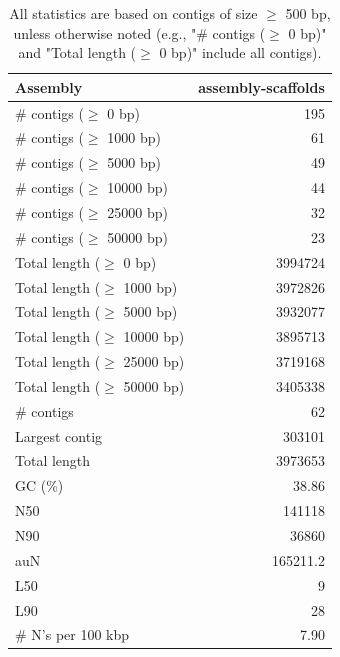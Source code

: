 \documentclass[12pt,a4paper]{article}
\begin{document}
\begin{table}[ht]
\begin{center}
\caption{All statistics are based on contigs of size $\geq$ 500 bp, unless otherwise noted (e.g., "\# contigs ($\geq$ 0 bp)" and "Total length ($\geq$ 0 bp)" include all contigs).}
\begin{tabular}{|l*{1}{|r}|}
\hline
Assembly & assembly-scaffolds \\ \hline
\# contigs ($\geq$ 0 bp) & 195 \\ \hline
\# contigs ($\geq$ 1000 bp) & 61 \\ \hline
\# contigs ($\geq$ 5000 bp) & 49 \\ \hline
\# contigs ($\geq$ 10000 bp) & 44 \\ \hline
\# contigs ($\geq$ 25000 bp) & 32 \\ \hline
\# contigs ($\geq$ 50000 bp) & 23 \\ \hline
Total length ($\geq$ 0 bp) & 3994724 \\ \hline
Total length ($\geq$ 1000 bp) & 3972826 \\ \hline
Total length ($\geq$ 5000 bp) & 3932077 \\ \hline
Total length ($\geq$ 10000 bp) & 3895713 \\ \hline
Total length ($\geq$ 25000 bp) & 3719168 \\ \hline
Total length ($\geq$ 50000 bp) & 3405338 \\ \hline
\# contigs & 62 \\ \hline
Largest contig & 303101 \\ \hline
Total length & 3973653 \\ \hline
GC (\%) & 38.86 \\ \hline
N50 & 141118 \\ \hline
N90 & 36860 \\ \hline
auN & 165211.2 \\ \hline
L50 & 9 \\ \hline
L90 & 28 \\ \hline
\# N's per 100 kbp & 7.90 \\ \hline
\end{tabular}
\end{center}
\end{table}
\end{document}
